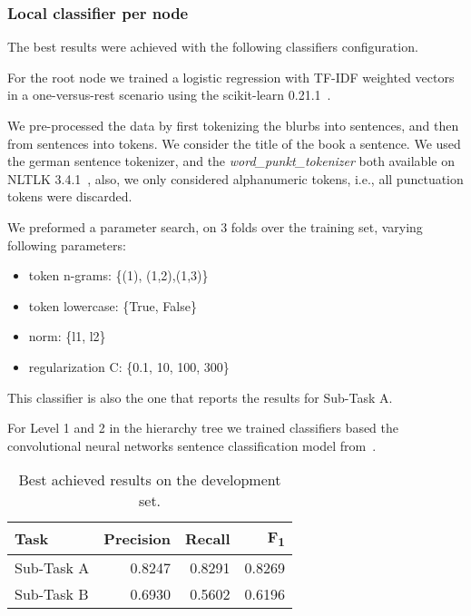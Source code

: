 \documentclass[11pt,a4paper]{article}
\begin{document}
\subsubsection{Local classifier per node}

The best results were achieved with the following classifiers configuration.

For the root node we trained a logistic regression with TF-IDF weighted vectors
in a one-versus-rest scenario using the scikit-learn 0.21.1~\cite{Pedregosa:2011:SML:1953048.2078195}.


We pre-processed the data by first tokenizing the blurbs into sentences, and then
from sentences into tokens. We consider the title of the book a sentence. We used
the german sentence tokenizer, and the \textit {word\_punkt\_tokenizer} both available
on NLTLK 3.4.1~\cite{Bird:2009:NLP:1717171}, also, we only considered alphanumeric
tokens, i.e., all punctuation tokens were discarded.


We preformed a parameter search, on 3 folds over the training set, varying following parameters:

\begin{itemize}
\item token n-grams: \{(1), (1,2),(1,3)\}
\item token lowercase: \{True, False\}
\item norm: \{l1, l2\}
\item regularization C: \{0.1, 10, 100, 300\}
\end{itemize}

This classifier is also the one that reports the results for Sub-Task A.

For Level 1 and 2 in the hierarchy tree we trained classifiers based the
convolutional neural networks sentence classification model from~\citet*{kim-2014-convolutional}.






\begin{table}[!h]
\begin{center}
\begin{tabular}{|l|r|r|r|}
\hline\centering\textbf{Task}  & \textbf{Precision} &  \textbf{Recall} &  \textbf{F\textsubscript{1}}\\
\hline
 Sub-Task A   & 0.8247 & 0.8291 & 0.8269 \\
 Sub-Task B   & 0.6930 & 0.5602 & 0.6196 \\
\hline
\end{tabular}
\end{center}
\caption{\label{devset-results} Best achieved results on the development set.}
\end{table}
\end{document}
